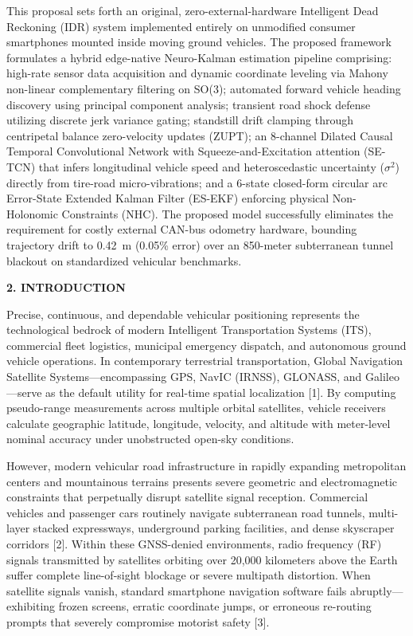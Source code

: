 \documentclass[11pt,a4paper]{article}
\begin{document}
This proposal sets forth an original, zero-external-hardware Intelligent Dead Reckoning (IDR) system implemented entirely on unmodified consumer smartphones mounted inside moving ground vehicles. The proposed framework formulates a hybrid edge-native Neuro-Kalman estimation pipeline comprising: high-rate sensor data acquisition and dynamic coordinate leveling via Mahony non-linear complementary filtering on SO(3); automated forward vehicle heading discovery using principal component analysis; transient road shock defense utilizing discrete jerk variance gating; standstill drift clamping through centripetal balance zero-velocity updates (ZUPT); an 8-channel Dilated Causal Temporal Convolutional Network with Squeeze-and-Excitation attention (SE-TCN) that infers longitudinal vehicle speed and heteroscedastic uncertainty ($\sigma^2$) directly from tire-road micro-vibrations; and a 6-state closed-form circular arc Error-State Extended Kalman Filter (ES-EKF) enforcing physical Non-Holonomic Constraints (NHC). The proposed model successfully eliminates the requirement for costly external CAN-bus odometry hardware, bounding trajectory drift to 0.42~m (0.05\% error) over an 850-meter subterranean tunnel blackout on standardized vehicular benchmarks.

\vspace{0.35cm}
\begin{center}
{\large \textbf{2. INTRODUCTION}}
\end{center}

Precise, continuous, and dependable vehicular positioning represents the technological bedrock of modern Intelligent Transportation Systems (ITS), commercial fleet logistics, municipal emergency dispatch, and autonomous ground vehicle operations. In contemporary terrestrial transportation, Global Navigation Satellite Systems—encompassing GPS, NavIC (IRNSS), GLONASS, and Galileo—serve as the default utility for real-time spatial localization [1]. By computing pseudo-range measurements across multiple orbital satellites, vehicle receivers calculate geographic latitude, longitude, velocity, and altitude with meter-level nominal accuracy under unobstructed open-sky conditions.

However, modern vehicular road infrastructure in rapidly expanding metropolitan centers and mountainous terrains presents severe geometric and electromagnetic constraints that perpetually disrupt satellite signal reception. Commercial vehicles and passenger cars routinely navigate subterranean road tunnels, multi-layer stacked expressways, underground parking facilities, and dense skyscraper corridors [2]. Within these GNSS-denied environments, radio frequency (RF) signals transmitted by satellites orbiting over 20,000 kilometers above the Earth suffer complete line-of-sight blockage or severe multipath distortion. When satellite signals vanish, standard smartphone navigation software fails abruptly—exhibiting frozen screens, erratic coordinate jumps, or erroneous re-routing prompts that severely compromise motorist safety [3].
\newpage
\end{document}
